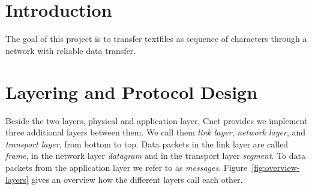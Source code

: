 
\title{\Large \lecture \\ \textbf{\normalsize \assignment}}
\author{\authors}

\setlength \headheight{25pt}
\fancyhead[L]{\authors}

\maketitle

\section{Introduction}
The goal of this project is to transfer textfiles as sequence of characters through a network with reliable data transfer. 

\section{Layering and Protocol Design}

Beside the two layers, physical and application layer, Cnet provides we implement three additional layers between them. We call them \emph{link layer}, \emph{network layer}, and \emph{transport layer}, from bottom to top. Data packets in the link layer are called \emph{frame}, in the network layer \emph{datagram} and in the transport layer \emph{segment}. To data packets from the application layer we refer to as \emph{messages}. Figure~\ref{fig:overview-layers} gives an overview how the different layers call each other.

